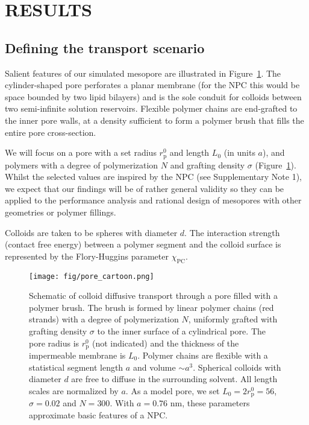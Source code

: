 \documentclass[12pt, a4paper]{article}
\begin{document}
\section{RESULTS}


\subsection{Defining the transport scenario}

Salient features of our simulated mesopore are illustrated in Figure~\ref{fig:colloid_transport}.
The cylinder-shaped pore perforates a planar membrane (for the NPC this would be space bounded by two lipid bilayers) and is the sole conduit for colloids between two semi-infinite solution reservoirs.
Flexible polymer chains are end-grafted to the inner pore walls, at a density sufficient to form a polymer brush that fills the entire pore cross-section.

We will focus on a pore with a set radius $r_{\text{p}}^0$ and length $L_0$ (in units $a$), and polymers with a degree of polymerization $N$ and grafting density $\sigma$ (Figure~\ref{fig:colloid_transport}).
Whilst the selected values are inspired by the NPC (see Supplementary Note 1), we expect that our findings will be of rather general validity so they can be applied to the performance analysis and rational design of mesopores with other geometries or polymer fillings.

Colloids are taken to be spheres with diameter $d$.
The interaction strength (contact free energy) between a polymer segment and the colloid surface is represented by the Flory-Huggins parameter $\chi_{\text{PC}}$.

\begin{figure}
    \centering
    \texttt{[image: fig/pore\_cartoon.png]}
    \caption{
        Schematic of colloid diffusive transport through a pore filled with a polymer brush. 
        The brush is formed by linear polymer chains (red strands) with a degree of polymerization $N$, uniformly grafted with grafting density $\sigma$ 
        to the inner surface of a cylindrical pore.
        The pore radius is $r_{\text{p}}^0$ (not indicated) and the thickness of the impermeable membrane is $L_0$.
        Polymer chains are flexible with a statistical segment length $a$ and volume $\sim a^3$. 
        Spherical colloids with diameter $d$ are free to diffuse in the surrounding solvent.
        All length scales are normalized by $a$.
        As a model pore, we set $L_0 = 2r_{\text{p}}^0 = 56$, $\sigma = 0.02$ and $N = 300$.
        With $a = 0.76 {\text{ nm}}$, these parameters approximate basic features of a NPC.
        }
    \label{fig:colloid_transport}
\end{figure}
\end{document}
